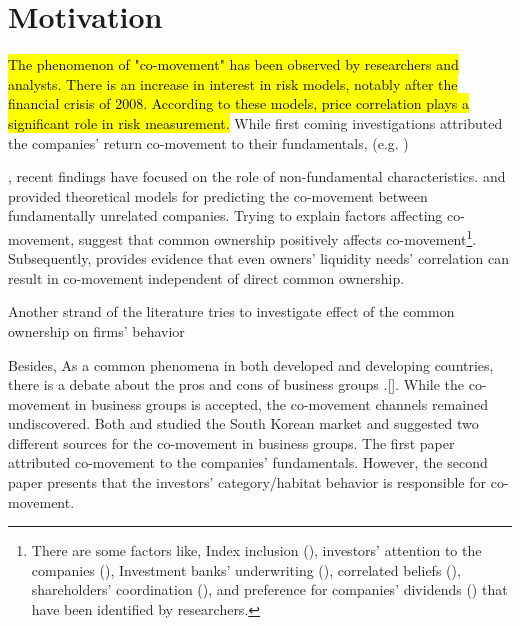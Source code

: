 \documentclass[12pt, a4paper]{article}
\begin{document}
\section*{Motivation}
	{
		
		\hl{The phenomenon of "co-movement" has been observed by researchers and analysts. There is an increase in interest in risk models, notably after the financial crisis of 2008. According to these models, price correlation plays a significant role in risk measurement.}
		 While first coming  investigations   attributed the companies' return co-movement to their fundamentals, (e.g. {\cite{shiller1989comovements}})}, recent findings have focused on the role of non-fundamental characteristics. {\cite{barberis2003style} and \cite{barberis2005comovement}} provided theoretical models for predicting the co-movement between fundamentally unrelated companies.	%
		{Trying to explain factors affecting co-movement, \cite{AntonPolk}} suggest that common ownership positively affects co-movement\footnote{There are some factors like, Index inclusion ({\cite{barberis2005comovement}}), investors' attention to the companies ({\cite{wu2014investor}}), Investment banks' underwriting ({\cite{grullon2014comovement}}), correlated beliefs ({\cite{david2016correlated}}), shareholders' coordination ({\cite{pantzalis2017shareholder}}), and preference for companies' dividends ({\cite{HAMEED2019103}}) that have been identified by researchers.}.
			Subsequently, {\cite{Liquidity2016}} provides evidence that even owners' liquidity needs' correlation can result in co-movement independent of direct common ownership. 	
		
		
		
		
		Another strand of the literature tries to investigate effect of the common ownership on firms' behavior
		
			
Besides, As a common phenomena in both developed and developing countries, there is a debate about the pros and cons of business groups .[\cite{khanna2000group}].
While the co-movement in business groups is accepted, the co-movement channels remained undiscovered.
Both {\cite{cho2015stock} and \cite{kim2015stock}} studied the South Korean market and suggested two different sources for the co-movement in business groups. The first paper attributed co-movement to the companies' fundamentals. However, the second paper presents that the investors' category/habitat behavior is responsible for co-movement.
		
\end{document}
